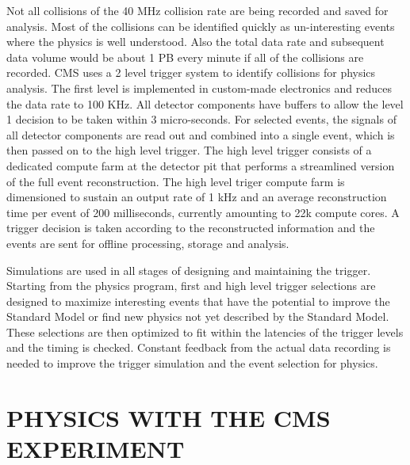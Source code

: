 \documentclass{wscpaperproc}
\theoremstyle{wsc}
\begin{document}
Not all collisions of the 40 MHz collision rate are being recorded and saved for analysis. Most of the collisions can be identified quickly as un-interesting events where the physics is well understood. Also the total data rate and subsequent data volume would be about 1 PB every minute if all of the collisions are recorded. CMS uses a 2 level trigger system to identify collisions for physics analysis. The first level is implemented in custom-made electronics and reduces the data rate to 100 KHz. All detector components have buffers to allow the level 1 decision to be taken within 3 micro-seconds. For selected events, the signals of all detector components are read out and combined into a single event, which is then passed on to the high level trigger. The high level trigger consists of a dedicated compute farm at the detector pit that performs a streamlined version of the full event reconstruction. The high level triger compute farm is dimensioned to sustain an output rate of 1 kHz and an average reconstruction time per event of 200 milliseconds, currently amounting to 22k compute cores. A trigger decision is taken according to the reconstructed information and the events are sent for offline processing, storage and analysis.

Simulations are used in all stages of designing and maintaining the trigger. Starting from the physics program, first and high level trigger selections are designed to maximize interesting events that have the potential to improve the Standard Model or find new physics not yet described by the Standard Model. These selections are then optimized to fit within the latencies of the trigger levels and the timing is checked. Constant feedback from the actual data recording is needed to improve the trigger simulation and the event selection for physics.

\section{PHYSICS WITH THE CMS EXPERIMENT}
\label{sec:computing}
\end{document}
